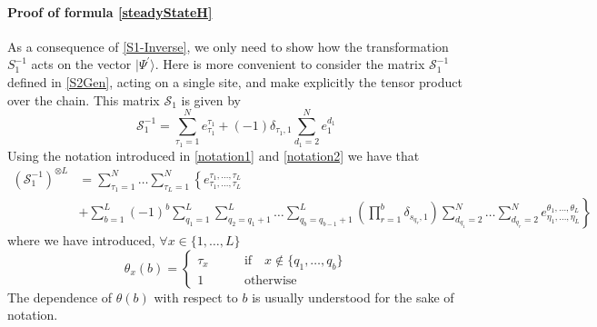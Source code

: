 \documentclass[11pt]{article}
\numberwithin{equation}{section}
\numberwithin{equation}{subsection}
\begin{document}
\paragraph{Proof of formula \eqref{steadyStateH}} As a consequence of \eqref{S1-Inverse}, we only need to show how the transformation $S_{1}^{-1}$ acts on the vector $|\Psi^{'}\rangle$. Here is more convenient to consider the matrix $\mathcal{S}_{1}^{-1}$ defined in \eqref{S2Gen}, acting on a single site, and make explicitly the tensor product over the chain. This matrix $\mathcal{S}_{1}$ is given by
\begin{equation}\label{S1-L1}
	\mathcal{S}_{1}^{-1}=\sum_{\tau_{1}=1}^{N}e_{\tau_{1}}^{\tau_{1}}+(-1)\delta_{\tau_{1},1}\sum_{d_{1}=2}^{N}e_{1}^{d_{1}}
\end{equation}
Using the notation introduced in \eqref{notation1} and \eqref{notation2} we have that 
\begin{equation}
	\begin{split}
		\left(\mathcal{S}_{1}^{-1}\right)^{\otimes L}&=\sum_{\tau_{1}=1}^{N}\ldots\sum_{\tau_{L}=1}^{N}\left\{e_{\tau_{1},\ldots,\tau_{L}}^{\tau_{1},\ldots,\tau_{L}}\right.
		\\&
		+\left.\sum_{b=1}^{L}(-1)^{b}\sum_{q_{1}=1}^{L}\sum_{q_{2}=q_{1}+1}^{L}\ldots\sum_{q_{b}=q_{b-1}+1}^{L}\left(\prod_{r=1}^{b}\delta_{s_{q_{r}},1}\right)\sum_{d_{q_{1}}=2}^{N}\ldots\sum_{d_{q_{r}}=2}^{N}e_{\eta_{1},\ldots,\eta_{L}}^{\theta_{1},\ldots,\theta_{L}}\right\} 
	\end{split}
\end{equation}
where we have introduced, $\forall x\in \{1,\ldots,L\}$
\begin{equation}
	 \theta_{x}(b)=\begin{cases}
		\tau_{x}\qquad &\text{if}\quad x\notin \{q_{1},\ldots,q_{b}\}\\
		1 \qquad &\text{otherwise}
\end{cases}
\end{equation}
The dependence of $\theta(b)$ with respect to $b$ is usually understood for the sake of notation. 
\end{document}
